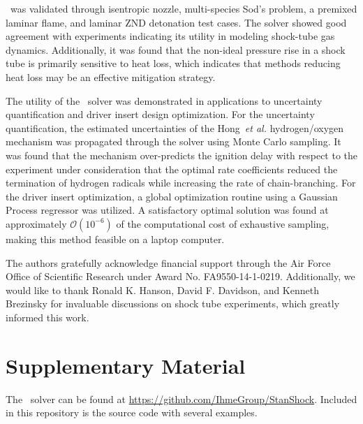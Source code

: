 \stnshk\ was validated through isentropic nozzle, multi-species Sod's problem, a premixed laminar flame, and laminar ZND detonation test cases. The solver showed good agreement with experiments indicating its utility in modeling shock-tube gas dynamics. Additionally, it was found that the non-ideal pressure rise in a shock tube is primarily sensitive to heat loss, which indicates that methods reducing heat loss may be an effective mitigation strategy.

The utility of the \stnshk\ solver was demonstrated in applications to uncertainty quantification and driver insert design optimization. For the uncertainty quantification, the estimated uncertainties of the Hong~\emph{et al.} hydrogen/oxygen mechanism was propagated through the solver using Monte Carlo sampling. It was found that the mechanism over-predicts the ignition delay with respect to the experiment under consideration that the optimal rate coefficients reduced the termination of hydrogen radicals while increasing the rate of chain-branching. For the driver insert optimization, a global optimization routine using a Gaussian Process regressor was utilized. A satisfactory optimal solution was found at approximately $\mathcal{O}(10^{-6})$ of the computational cost of exhaustive sampling, making this method feasible on a laptop computer. 
\begin{acknowledgements}

The authors gratefully acknowledge financial support through the Air Force Office of Scientific Research under Award No. FA9550-14-1-0219. Additionally, we would like to thank Ronald K. Hanson, David F. Davidson, and Kenneth Brezinsky for invaluable discussions on shock tube experiments, which greatly informed this work.
\end{acknowledgements}

\section{Supplementary Material}
The \stnshk\ solver can be found at \url{https://github.com/IhmeGroup/StanShock}. Included in this repository is the source code with several examples.




